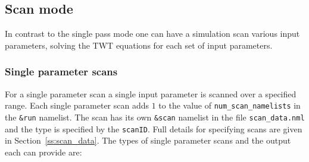 \documentclass{article}
\begin{document}
\subsection{Scan mode}
In contrast to the single pass mode one can have a simulation scan various
input parameters, solving the TWT equations for each set of input
parameters.

\subsubsection{Single parameter scans}
For a single parameter scan a single input parameter is scanned over
a specified range. Each single parameter scan adds $1$ to the value of
{\tt num\_scan\_namelists} in the
{\tt \&run} namelist. The scan has its own {\tt \&scan} namelist
in the file {\tt scan\_data.nml} and the type is specified by the
{\tt scanID}. Full details for specifying
scans are given in Section~\ref{ss:scan_data}. The types of single parameter
scans and the output each can provide are:
\end{document}
